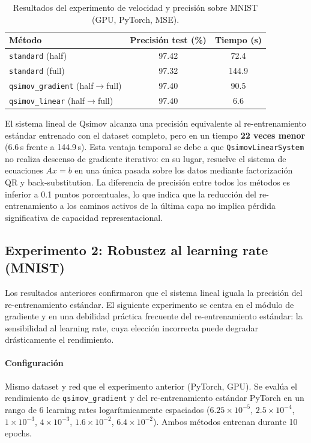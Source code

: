 \begin{table}[htbp]
  \centering
  \caption{Resultados del experimento de velocidad y precisión sobre MNIST (GPU, PyTorch, MSE).}
  \label{tab:tabla2}
  \begin{tabular}{lcc}
    \toprule
    \textbf{Método} & \textbf{Precisión test (\%)} & \textbf{Tiempo (s)} \\
    \midrule
    \texttt{standard} (half)              & 97.42 & 72.4 \\
    \texttt{standard} (full)              & 97.32 & 144.9 \\
    \texttt{qsimov\_gradient} (half$\rightarrow$full) & 97.40 & 90.5 \\
    \texttt{qsimov\_linear} (half$\rightarrow$full)   & 97.40 & 6.6 \\
    \bottomrule
  \end{tabular}
\end{table}

El sistema lineal de Qsimov alcanza una precisión equivalente al re-entrenamiento estándar
entrenado con el dataset completo, pero en un tiempo \textbf{22 veces menor} (6.6\,s frente a
144.9\,s). Esta ventaja temporal se debe a que \texttt{QsimovLinearSystem} no realiza descenso de
gradiente iterativo: en su lugar, resuelve el sistema de ecuaciones $Ax = b$ en una única pasada
sobre los datos mediante factorización QR y back-substitution. La diferencia de precisión entre
todos los métodos es inferior a 0.1 puntos porcentuales, lo que indica que la reducción del
re-entrenamiento a los caminos activos de la última capa no implica pérdida significativa de
capacidad representacional.

\subsection{Experimento 2: Robustez al learning rate (MNIST)}

Los resultados anteriores confirmaron que el sistema lineal iguala la precisión del
re-entrenamiento estándar. El siguiente experimento se centra en el módulo de gradiente y en una
debilidad práctica frecuente del re-entrenamiento estándar: la sensibilidad al learning rate, cuya
elección incorrecta puede degradar drásticamente el rendimiento.

\paragraph{Configuración} Mismo dataset y red que el experimento anterior (PyTorch, GPU). Se evalúa
el rendimiento de \texttt{qsimov\_gradient} y del re-entrenamiento estándar PyTorch en un rango de
6 learning rates logarítmicamente espaciados ($6.25 \times 10^{-5}$, $2.5 \times 10^{-4}$,
$1 \times 10^{-3}$, $4 \times 10^{-3}$, $1.6 \times 10^{-2}$, $6.4 \times 10^{-2}$). Ambos
métodos entrenan durante 10 epochs.

